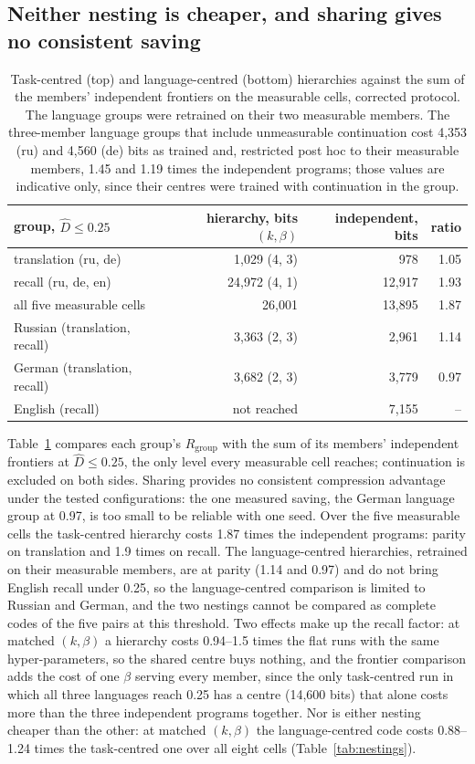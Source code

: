 \documentclass{article}
\newcommand{\Dh}{\hat D}
\begin{document}
\subsection{Neither nesting is cheaper, and sharing gives no consistent saving}\label{sec:hier}
\begin{table}[t]
\centering\small
\begin{tabular}{lrrr}
\toprule
group, $\Dh\le0.25$ & hierarchy, bits $(k,\beta)$ & independent, bits & ratio \\
\midrule
translation (ru, de) & 1,029 (4, 3) & 978 & 1.05 \\
recall (ru, de, en) & 24,972 (4, 1) & 12,917 & 1.93 \\
all five measurable cells & 26,001 & 13,895 & 1.87 \\
\midrule
Russian (translation, recall) & 3,363 (2, 3) & 2,961 & 1.14 \\
German (translation, recall) & 3,682 (2, 3) & 3,779 & 0.97 \\
English (recall) & not reached & 7,155 & -- \\
\bottomrule
\end{tabular}
\caption{Task-centred (top) and language-centred (bottom) hierarchies against the sum of the members' independent frontiers on the measurable cells, corrected protocol. The language groups were retrained on their two measurable members. The three-member language groups that include unmeasurable continuation cost 4,353 (ru) and 4,560 (de) bits as trained and, restricted post hoc to their measurable members, 1.45 and 1.19 times the independent programs; those values are indicative only, since their centres were trained with continuation in the group.}
\label{tab:groups}
\end{table}

Table~\ref{tab:groups} compares each group's $R_{\mathrm{group}}$ with the sum of its members' independent frontiers at $\Dh\le0.25$, the only level every measurable cell reaches; continuation is excluded on both sides. Sharing provides no consistent compression advantage under the tested configurations: the one measured saving, the German language group at 0.97, is too small to be reliable with one seed. Over the five measurable cells the task-centred hierarchy costs 1.87 times the independent programs: parity on translation and 1.9 times on recall. The language-centred hierarchies, retrained on their measurable members, are at parity (1.14 and 0.97) and do not bring English recall under 0.25, so the language-centred comparison is limited to Russian and German, and the two nestings cannot be compared as complete codes of the five pairs at this threshold. Two effects make up the recall factor: at matched $(k,\beta)$ a hierarchy costs 0.94--1.5 times the flat runs with the same hyper-parameters, so the shared centre buys nothing, and the frontier comparison adds the cost of one $\beta$ serving every member, since the only task-centred run in which all three languages reach 0.25 has a centre (14,600 bits) that alone costs more than the three independent programs together. Nor is either nesting cheaper than the other: at matched $(k,\beta)$ the language-centred code costs 0.88--1.24 times the task-centred one over all eight cells (Table~\ref{tab:nestings}).
\end{document}
